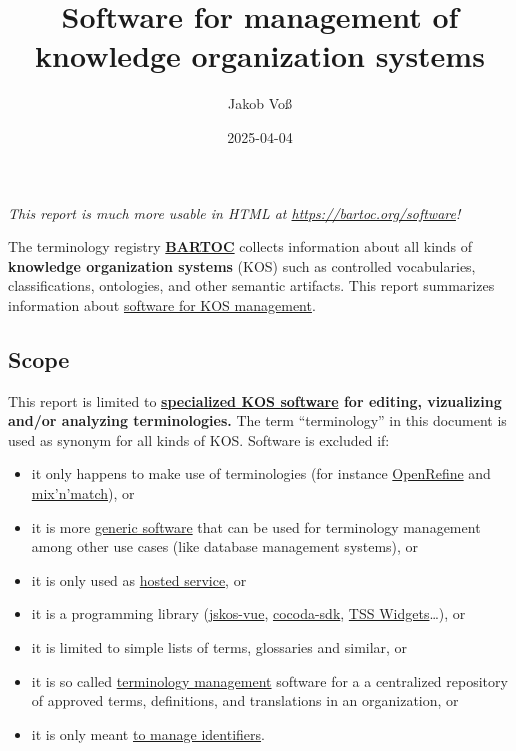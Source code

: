 \documentclass[
  DIV=10]{article}
\title{Software for management of knowledge organization systems}
\author{Jakob Voß}
\affil{%
                  Verbundzentrale des GBV (VZG)
              }
\date{2025-04-04}
\providecommand{\tightlist}{%
  \setlength{\itemsep}{0pt}\setlength{\parskip}{0pt}}\usepackage{longtable,booktabs,array}
\begin{document}
\maketitle


\large

\emph{This report is much more usable in HTML at
\url{https://bartoc.org/software}!} \vspace*{20mm}

The terminology registry \textbf{\href{https://bartoc.org/}{BARTOC}}
collects information about all kinds of \textbf{knowledge organization
systems} (KOS) such as controlled vocabularies, classifications,
ontologies, and other semantic artifacts. This report summarizes
information about \hyperref[kos-software]{software for KOS management}.

\subsection{Scope}\label{scope}

This report is limited to \textbf{\hyperref[kos-software]{specialized
KOS software} for editing, vizualizing and/or analyzing terminologies.}
The term ``terminology'' in this document is used as synonym for all
kinds of KOS. Software is excluded if:

\begin{itemize}
\tightlist
\item
  it only happens to make use of terminologies (for instance
  \href{https://openrefine.org/}{OpenRefine} and
  \href{https://mix-n-match.toolforge.org/}{mix'n'match}), or
\item
  it is more \hyperref[generic-software]{generic software} that can be
  used for terminology management among other use cases (like database
  management systems), or
\item
  it is only used as \hyperref[hosted-services]{hosted service}, or
\item
  it is a programming library
  (\href{https://github.com/gbv/jskos-vue/}{jskos-vue},
  \href{https://github.com/gbv/cocoda-sdk/}{cocoda-sdk},
  \href{https://github.com/ts4nfdi/terminology-service-suite}{TSS
  Widgets}\ldots), or
\item
  it is limited to simple lists of terms, glossaries and similar, or
\item
  it is so called \hyperref[terminology-management]{terminology
  management} software for a a centralized repository of approved terms,
  definitions, and translations in an organization, or
\item
  it is only meant \hyperref[identifier-systems]{to manage identifiers}.
\end{itemize}
\end{document}
